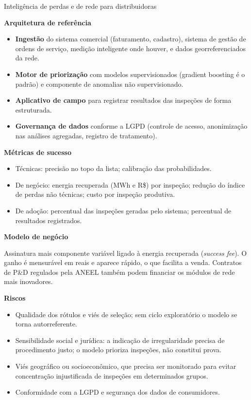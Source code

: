 \documentclass[10pt,a4paper,oneside]{article}
\newcommand{\prodsec}[1]{\par\medskip\noindent\textbf{\color{prodcolor}#1}\par\smallskip}
\begin{document}
\begin{produto}{Inteligência de perdas e de rede para distribuidoras}
\prodsec{Arquitetura de referência}
\begin{itemize}
  \item \textbf{Ingestão} do sistema comercial (faturamento, cadastro),
    sistema de gestão de ordens de serviço, medição inteligente onde houver, e
    dados georreferenciados da rede.
  \item \textbf{Motor de priorização} com modelos supervisionados (gradient
    boosting é o padrão) e componente de anomalias não supervisionado.
  \item \textbf{Aplicativo de campo} para registrar resultados das inspeções
    de forma estruturada.
  \item \textbf{Governança de dados} conforme a LGPD (controle de acesso,
    anonimização nas análises agregadas, registro de tratamento).
\end{itemize}

\prodsec{Métricas de sucesso}
\begin{itemize}
  \item Técnicas: precisão no topo da lista; calibração das probabilidades.
  \item De negócio: energia recuperada (MWh e R\$) por inspeção; redução do
    índice de perdas não técnicas; custo por inspeção produtiva.
  \item De adoção: percentual das inspeções geradas pelo sistema;
    percentual de resultados registrados.
\end{itemize}

\prodsec{Modelo de negócio}
Assinatura mais componente variável ligado à energia recuperada
(\textit{success fee}). O ganho é mensurável em reais e aparece rápido, o que
facilita a venda. Contratos de P\&D regulados pela ANEEL também podem
financiar os módulos de rede mais inovadores.

\prodsec{Riscos}
\begin{itemize}
  \item Qualidade dos rótulos e viés de seleção; sem ciclo exploratório o
    modelo se torna autorreferente.
  \item Sensibilidade social e jurídica: a indicação de irregularidade precisa
    de procedimento justo; o modelo prioriza inspeções, não constitui prova.
  \item Viés geográfico ou socioeconômico, que precisa ser monitorado para
    evitar concentração injustificada de inspeções em determinados grupos.
  \item Conformidade com a LGPD e segurança dos dados de consumidores.
\end{itemize}
\end{produto}
\end{document}

